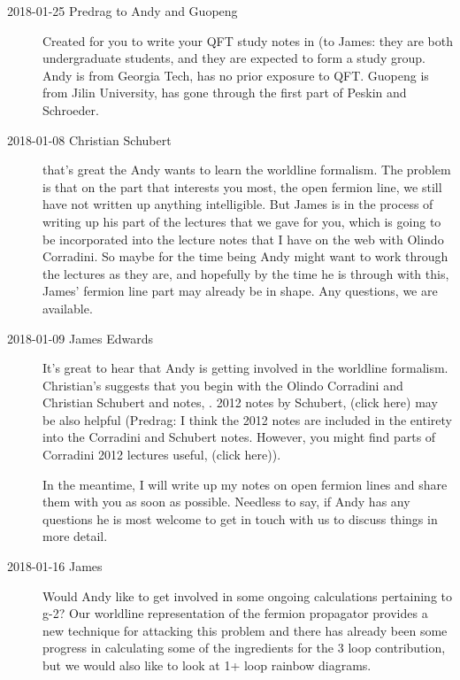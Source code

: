 \begin{description}

\item[2018-01-25  Predrag to Andy and Guopeng]
    Created  for you to write your QFT study notes
    in (to James: they are both undergraduate students, and they are
    expected to form a study group. Andy is from Georgia Tech, has no
    prior exposure to QFT. Guopeng is from Jilin University, has gone
    through the first part of Peskin and Schroeder.


\item[2018-01-08 Christian Schubert]
that's great the Andy wants to learn the worldline formalism. The problem
is that on the part that interests you most, the open fermion line, we
still have not written up anything intelligible. But James is in
the process of writing up his part of the lectures that we gave for you,
which is going to be incorporated into the lecture notes that I have on
the web with Olindo Corradini. So maybe for the time being Andy might
want to work through the lectures as they are, and hopefully by the time
he is through with this, James' fermion line part may already be in shape.
Any questions, we are available.

\item[2018-01-09 James Edwards ]
It's great to hear that Andy is getting involved in the worldline
formalism. Christian's suggests that you begin with the Olindo Corradini
and Christian Schubert and
 notes, . 2012 notes by
Schubert,
{(click here)} may be also helpful
(Predrag: I think the 2012 notes are included in the entirety into the
Corradini and Schubert  notes. However, you might find parts of
Corradini 2012 lectures useful,
{(click here)}).

In the meantime, I will write up my notes on open fermion lines and share
them with you as soon as possible. Needless to say, if Andy has any
questions he is most welcome to get in touch with us to discuss things in
more detail.

\item[2018-01-16 James]
Would Andy like to get involved in some ongoing calculations pertaining
to g-2? Our worldline representation of the fermion propagator provides a
new technique for attacking this problem and there has already been some
progress in calculating some of the ingredients for the 3 loop
contribution, but we would also like to look at 1+ loop rainbow diagrams.


\end{description}
